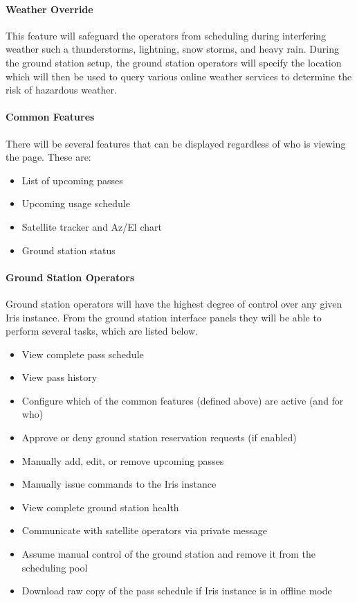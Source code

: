 \documentclass{mxl-note}
\begin{document}
\paragraph{Weather Override} This feature will safeguard the operators from scheduling during interfering weather such a thunderstorms, lightning, snow storms, and heavy rain. During the ground station setup, the ground station operators will specify the location which will then be used to query various online weather services to determine the risk of hazardous weather.

\paragraph{Common Features} There will be several features that can be displayed regardless of who is viewing the page. These are:
\begin{itemize}
	\item List of upcoming passes
	\item Upcoming usage schedule
	\item Satellite tracker and Az/El chart
	\item Ground station status
\end{itemize}

\paragraph{Ground Station Operators} Ground station operators will have the highest degree of control over any given Iris instance. From the ground station interface panels they will be able to perform several tasks, which are listed below.
\begin{itemize}
	\item View complete pass schedule
	\item View pass history
	\item Configure which of the common features (defined above) are active (and for who)
	\item Approve or deny ground station reservation requests (if enabled)
	\item Manually add, edit, or remove upcoming passes
	\item Manually issue commands to the Iris instance
	\item View complete ground station health
	\item Communicate with satellite operators via private message
	\item Assume manual control of the ground station and remove it from the scheduling pool
	\item Download raw copy of the pass schedule if Iris instance is in offline mode
\end{itemize}
\end{document}
